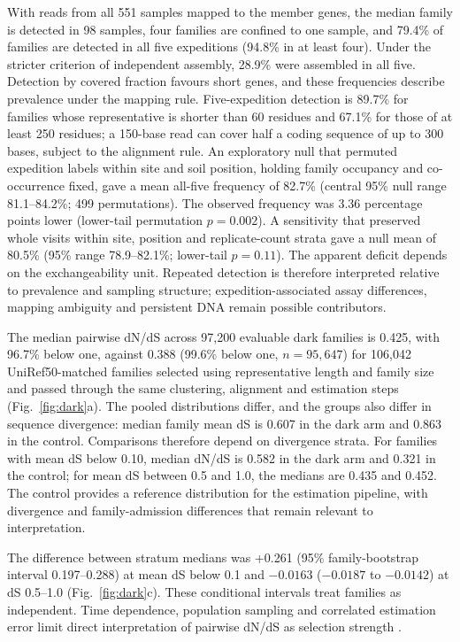 \documentclass[11pt]{article}
\begin{document}
With reads from all 551 samples mapped to the member genes, the median family is
detected in 98 samples, four families are confined to one sample, and 79.4\% of families are detected
in all five expeditions (94.8\% in at least four). Under the stricter criterion of independent
assembly, 28.9\% were assembled in all five. Detection by covered fraction
favours short genes, and these frequencies describe prevalence under the mapping rule. Five-expedition detection is 89.7\% for families whose representative is shorter than 60 residues and 67.1\% for those of at least 250 residues; a 150-base read can cover half a coding sequence of up to 300 bases, subject to the alignment rule. An exploratory null that permuted expedition labels within site and soil position, holding family occupancy and co-occurrence fixed, gave a mean all-five frequency of 82.7\% (central 95\% null range 81.1--84.2\%; 499 permutations). The observed frequency was 3.36 percentage points lower (lower-tail permutation $p = 0.002$). A sensitivity that preserved whole visits within site, position and replicate-count strata gave a null mean of 80.5\% (95\% range 78.9--82.1\%; lower-tail $p = 0.11$). The apparent deficit depends on the exchangeability unit. Repeated detection is therefore interpreted relative to prevalence and sampling structure; expedition-associated assay differences, mapping ambiguity and persistent DNA remain possible contributors.

The median pairwise dN/dS across 97{,}200 evaluable dark families is 0.425, with 96.7\%
below one, against 0.388 (99.6\% below one, $n = 95{,}647$) for 106{,}042 UniRef50-matched families
selected using representative length and family size and passed through the same clustering,
alignment and estimation steps (Fig.~\ref{fig:dark}a). The pooled distributions differ, and the groups also differ in sequence divergence: median
family mean dS is 0.607 in the dark arm and 0.863 in the control. Comparisons therefore depend
on divergence strata. For families with mean dS below 0.10, median dN/dS is 0.582 in the dark
arm and 0.321 in the control; for mean dS between 0.5 and 1.0, the medians are 0.435 and 0.452.
The control provides a reference distribution for the estimation pipeline, with divergence and
family-admission differences that remain relevant to interpretation.

The difference between stratum medians was +0.261 (95\% family-bootstrap interval
0.197--0.288) at mean dS below 0.1 and $-0.0163$ ($-0.0187$ to $-0.0142$) at dS 0.5--1.0
(Fig.~\ref{fig:dark}c). These conditional intervals treat families as independent.
Time dependence, population sampling and correlated estimation error limit direct interpretation
of pairwise dN/dS as selection strength \citep{kryazhimskiy2008dnds,mugal2014time}.
\end{document}
